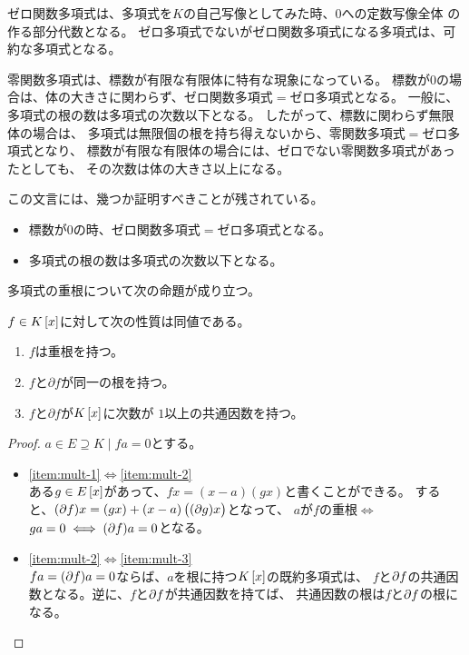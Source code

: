 {	ゼロ関数多項式は、多項式を$K$の自己写像としてみた時、$0$への定数写像全体
	の作る部分代数となる。
	ゼロ多項式でないがゼロ関数多項式になる多項式は、可約な多項式となる。

	零関数多項式は、標数が有限な有限体に特有な現象になっている。
	標数が$0$の場合は、体の大きさに関わらず、ゼロ関数多項式$=$ゼロ多項式となる。
	一般に、多項式の根の数は多項式の次数以下となる。
	したがって、標数に関わらず無限体の場合は、
	多項式は無限個の根を持ち得えないから、零関数多項式$=$ゼロ多項式となり、
	標数が有限な有限体の場合には、ゼロでない零関数多項式があったとしても、
	その次数は体の大きさ以上になる\cite{cox:2000}。

	\begin{todo}[証明すべきこと]\label{todo:証明すべきこと} %
		この文言には、幾つか証明すべきことが残されている。
		\begin{itemize}\setlength{\itemsep}{-1mm} %
			\item 標数が$0$の時、ゼロ関数多項式$=$ゼロ多項式となる。
			\item 多項式の根の数は多項式の次数以下となる。
		\end{itemize} %
	\end{todo} %

	多項式の重根について次の命題が成り立つ。

	\begin{proposition}[多項式の重根]\label{prop:多項式の重根} %
		$f\in K\mathinner{[{x}]}$に対して次の性質は同値である。
		\begin{enumerate}\setlength{\itemsep}{-1mm} %
			\item\label{item:mult-1} $f$は重根を持つ。
			\item\label{item:mult-2} $f$と$\partial f$が同一の根を持つ。
			\item\label{item:mult-3} $f$と$\partial f$が$K\mathinner{[{x}]}$に次数が
			$1$以上の共通因数を持つ。
		\end{enumerate} %
	\end{proposition} %
	\begin{proof} %
		$a\in E\supseteq K\mid fa=0$とする。
		\begin{itemize}\setlength{\itemsep}{-1mm} %
			\item \ref{item:mult-1}$\iff$\ref{item:mult-2} \\
			ある$g\in E\mathinner{[{x}]}$があって、$fx=(x-a)(gx)$と書くことができる。
			すると、$({\partial} f)x=(gx)+(x-a)\mathinner{\bigl({({\partial}g)x}\bigr)}$となって、
			$a$が$f$の重根$\iff$$ga=0\iff({\partial} f)a=0$となる。
			\item \ref{item:mult-2}$\iff$\ref{item:mult-3} \\
			$fa=({\partial} f)a=0$ならば、$a$を根に持つ$K\mathinner{[{x}]}$の既約多項式は、
			$f$と${\partial} f$の共通因数となる。逆に、$f$と${\partial} f$が共通因数を持てば、
			共通因数の根は$f$と${\partial} f$の根になる。
		\end{itemize} %
	\end{proof} %

}
